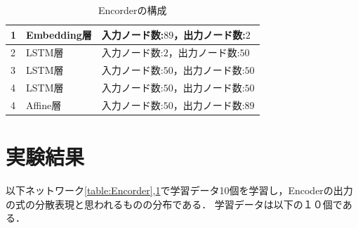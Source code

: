 \documentclass[a4j,11pt,report]{jsbook}
\begin{document}
\begin{table}[hbt]
  \begin{center}
    \caption{Encorderの構成}
    \label{table:Decorder}
    \begin{tabularx}{0.9\linewidth}{|l|l|X|}
      \hline
      1 & Embedding層 & 入力ノード数:$89$，出力ノード数:$2$ \\
      \hline
      2 & LSTM層 & 入力ノード数:$2$，出力ノード数:$50$ \\
      \hline
      3 & LSTM層 & 入力ノード数:$50$，出力ノード数:$50$ \\
      \hline
      4 & LSTM層 & 入力ノード数:$50$，出力ノード数:$50$ \\
      \hline
      4 & Affine層 & 入力ノード数:$50$，出力ノード数:$89$ \\
      \hline
    \end{tabularx}
  \end{center}
\end{table}
\clearpage

\section{実験結果}
以下ネットワーク\ref{table:Encorder},\ref{table:Decorder}で学習データ10個を学習し，Encoderの出力の式の分散表現と思われるものの分布である．
学習データは以下の１０個である．
\end{document}
